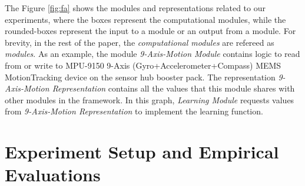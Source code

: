 \documentclass[letterpaper]{article}
\begin{document}
\begin{sloppy}
The Figure \ref{fig:fa} shows the modules and representations related to our 
experiments, where the boxes represent the computational modules, while the rounded-boxes represent 
the input to a module or an output from a module. For brevity, in the rest of the paper, the  
{\em computational modules} are refereed as  {\em modules}. As an example, the module {\em 
9-Axis-Motion Module} contains logic to read from or write to MPU-9150 9-Axis 
(Gyro+Accelerometer+Compass) MEMS MotionTracking device on the sensor hub booster pack. The 
representation {\em 9-Axis-Motion Representation} contains all the values that 
this module shares with other modules in the framework. In this graph, {\em 
Learning Module} requests values from {\em 9-Axis-Motion Representation} to implement the learning 
function. 
  


\section{Experiment Setup and Empirical Evaluations}


\end{sloppy}
\end{document}
